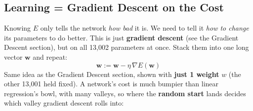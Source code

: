\subsection*{Learning = Gradient Descent on the Cost}
\begin{keeptogether}
Knowing $E$ only tells the network \textit{how bad} it is. We need to tell it \textit{how to change} its parameters to do better. This is just \textbf{gradient descent} (see the Gradient Descent section), but on all 13{,}002 parameters at once. Stack them into one long vector $\mathbf{w}$ and repeat:
\[
\mathbf{w} := \mathbf{w} - \eta\, \nabla E(\mathbf{w})
\]
Same idea as the Gradient Descent section, shown with \textbf{just 1 weight} $w$ (the other 13{,}001 held fixed). A network's cost is much bumpier than linear regression's bowl, with many valleys, so where the \textbf{random start} lands decides which valley gradient descent rolls into:


\end{keeptogether}
